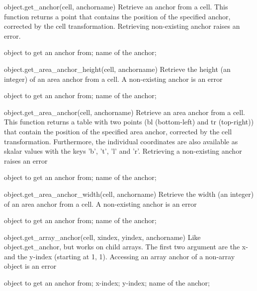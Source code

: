 \begin{APIfunc}{object.get\_anchor(cell, anchorname)}
    Retrieve an anchor from a cell. This function returns a point that contains the position of the specified anchor, corrected by the cell transformation. Retrieving non-existing anchor raises an error.
    \begin{APIparameters}
            object to get an anchor from;
            name of the anchor;
    \end{APIparameters}
\end{APIfunc}
\begin{APIfunc}{object.get\_area\_anchor\_height(cell, anchorname)}
    Retrieve the height (an integer) of an area anchor from a cell. A non-existing anchor is an error
    \begin{APIparameters}
            object to get an anchor from;
            name of the anchor;
    \end{APIparameters}
\end{APIfunc}
\begin{APIfunc}{object.get\_area\_anchor(cell, anchorname)}
    Retrieve an area anchor from a cell. This function returns a table with two points (bl (bottom-left) and tr (top-right)) that contain the position of the specified area anchor, corrected by the cell transformation. Furthermore, the individual coordinates are also available as skalar values with the keys 'b', 't', 'l' and 'r'. Retrieving a non-existing anchor raises an error
    \begin{APIparameters}
            object to get an anchor from;
            name of the anchor;
    \end{APIparameters}
\end{APIfunc}
\begin{APIfunc}{object.get\_area\_anchor\_width(cell, anchorname)}
    Retrieve the width (an integer) of an area anchor from a cell. A non-existing anchor is an error
    \begin{APIparameters}
            object to get an anchor from;
            name of the anchor;
    \end{APIparameters}
\end{APIfunc}
\begin{APIfunc}{object.get\_array\_anchor(cell, xindex, yindex, anchorname)}
    Like object.get\_anchor, but works on child arrays. The first two argument are the x- and the y-index (starting at 1, 1). Accessing an array anchor of a non-array object is an error
    \begin{APIparameters}
            object to get an anchor from;
            x-index;
            y-index;
            name of the anchor;
    \end{APIparameters}
\end{APIfunc}
